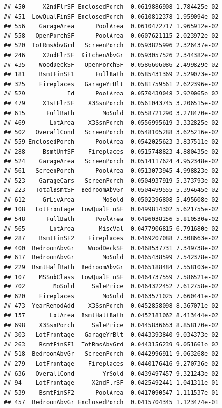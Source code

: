 \documentclass[american,]{article}
\theoremstyle{definition}
\theoremstyle{definition}
\theoremstyle{definition}
\theoremstyle{remark}
\begin{document}
\begin{verbatim}
## 450     X2ndFlrSF EnclosedPorch  0.0619886908 1.784425e-02
## 451  LowQualFinSF EnclosedPorch  0.0610812378 1.959094e-02
## 556    GarageArea      PoolArea  0.0610472717 1.965912e-02
## 558   OpenPorchSF      PoolArea  0.0607621115 2.023972e-02
## 520  TotRmsAbvGrd   ScreenPorch  0.0593825996 2.326437e-02
## 246     X2ndFlrSF  KitchenAbvGr  0.0593057526 2.344382e-02
## 435    WoodDeckSF   OpenPorchSF  0.0586606086 2.499829e-02
## 181    BsmtFinSF1      FullBath  0.0585431369 2.529073e-02
## 325    Fireplaces   GarageYrBlt  0.0581759561 2.622396e-02
## 529            Id      PoolArea  0.0570439048 2.929065e-02
## 479     X1stFlrSF    X3SsnPorch  0.0561043745 3.206515e-02
## 615      FullBath        MoSold  0.0558721290 3.278470e-02
## 469       LotArea    X3SsnPorch  0.0556995619 3.332825e-02
## 502   OverallCond   ScreenPorch  0.0548105288 3.625216e-02
## 559 EnclosedPorch      PoolArea  0.0542025623 3.837511e-02
## 288     BsmtUnfSF    Fireplaces  0.0515748823 4.880435e-02
## 524    GarageArea   ScreenPorch  0.0514117624 4.952348e-02
## 561   ScreenPorch      PoolArea  0.0513073945 4.998823e-02
## 523    GarageCars   ScreenPorch  0.0504937919 5.373793e-02
## 223   TotalBsmtSF  BedroomAbvGr  0.0504499555 5.394645e-02
## 612     GrLivArea        MoSold  0.0502396808 5.495608e-02
## 108   LotFrontage  LowQualFinSF  0.0499814302 5.621755e-02
## 548      FullBath      PoolArea  0.0496038256 5.810530e-02
## 565       LotArea       MiscVal  0.0477906815 6.791680e-02
## 287    BsmtFinSF2    Fireplaces  0.0469207088 7.308663e-02
## 400  BedroomAbvGr    WoodDeckSF  0.0468537731 7.349738e-02
## 617  BedroomAbvGr        MoSold  0.0465438599 7.542378e-02
## 229  BsmtHalfBath  BedroomAbvGr  0.0465188484 7.558103e-02
## 107    MSSubClass  LowQualFinSF  0.0464737559 7.586521e-02
## 702        MoSold     SalePrice  0.0464322452 7.612758e-02
## 620    Fireplaces        MoSold  0.0463571025 7.660441e-02
## 473  YearRemodAdd    X3SsnPorch  0.0452858098 8.367071e-02
## 157       LotArea  BsmtHalfBath  0.0452181062 8.413444e-02
## 698    X3SsnPorch     SalePrice  0.0445836653 8.858170e-02
## 303   LotFrontage   GarageYrBlt  0.0443393840 9.034373e-02
## 263    BsmtFinSF1  TotRmsAbvGrd  0.0443156239 9.051661e-02
## 518  BedroomAbvGr   ScreenPorch  0.0442996911 9.063268e-02
## 279   LotFrontage    Fireplaces  0.0440176416 9.270736e-02
## 636   OverallCond        YrSold  0.0439497457 9.321243e-02
## 94    LotFrontage     X2ndFlrSF  0.0425492441 1.041311e-01
## 539    BsmtFinSF2      PoolArea  0.0417090547 1.111537e-01
## 457  BedroomAbvGr EnclosedPorch  0.0415704345 1.123474e-01

\end{verbatim}
\end{document}
